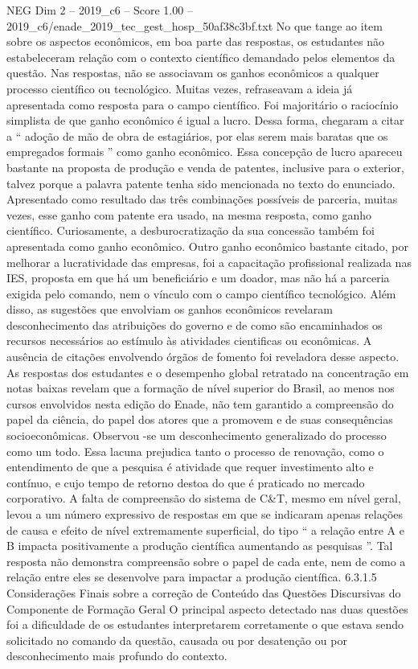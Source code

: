 \begin{textsample}{NEG Dim 2 – 2019\_c6 – Score 1.00 – 2019\_c6/enade\_2019\_tec\_gest\_hosp\_50af38c3bf.txt}
No que tange ao item sobre os aspectos econômicos, em boa parte das respostas, os estudantes não estabeleceram relação com o contexto científico demandado pelos elementos da questão.
Nas respostas, não se associavam os ganhos econômicos a qualquer processo científico ou tecnológico.
Muitas vezes, refraseavam a ideia já apresentada como resposta para o campo científico.
Foi majoritário o raciocínio simplista de que ganho econômico é igual a lucro.
Dessa forma, chegaram a citar a “ adoção de mão de obra de estagiários, por elas serem mais baratas que os empregados formais ” como ganho econômico.
Essa concepção de lucro apareceu bastante na proposta de produção e venda de patentes, inclusive para o exterior, talvez porque a palavra patente tenha sido mencionada no texto do enunciado.
Apresentado como resultado das três combinações possíveis de parceria, muitas vezes, esse ganho com patente era usado, na mesma resposta, como ganho científico.
Curiosamente, a desburocratização da sua concessão também foi apresentada como ganho econômico.
Outro ganho econômico bastante citado, por melhorar a lucratividade das empresas, foi a capacitação profissional realizada nas IES, proposta em que há um beneficiário e um doador, mas não há a parceria exigida pelo comando, nem o vínculo com o campo científico tecnológico.
Além disso, as sugestões que envolviam os ganhos econômicos revelaram desconhecimento das atribuições do governo e de como são encaminhados os recursos necessários ao estímulo às atividades cientificas ou econômicas.
A ausência de citações envolvendo órgãos de fomento foi reveladora desse aspecto.
As respostas dos estudantes e o desempenho global retratado na concentração em notas baixas revelam que a formação de nível superior do Brasil, ao menos nos cursos envolvidos nesta edição do Enade, não tem garantido a compreensão do papel da ciência, do papel dos atores que a promovem e de suas consequências socioeconômicas.
Observou -se um desconhecimento generalizado do processo como um todo.
Essa lacuna prejudica tanto o processo de renovação, como o entendimento de que a pesquisa é atividade que requer investimento alto e contínuo, e cujo tempo de retorno destoa do que é praticado no mercado corporativo.
A falta de compreensão do sistema de C\&T, mesmo em nível geral, levou a um número expressivo de respostas em que se indicaram apenas relações de causa e efeito de nível extremamente superficial, do tipo “ a relação entre A e B impacta positivamente a produção científica aumentando as pesquisas ”.
Tal resposta não demonstra compreensão sobre o papel de cada ente, nem de como a relação entre eles se desenvolve para impactar a produção científica. 6.3.1.5 Considerações Finais sobre a correção de Conteúdo das Questões Discursivas do Componente de Formação Geral O principal aspecto detectado nas duas questões foi a dificuldade de os estudantes interpretarem corretamente o que estava sendo solicitado no comando da questão, causada ou por desatenção ou por desconhecimento mais profundo do contexto.

\end{textsample}
